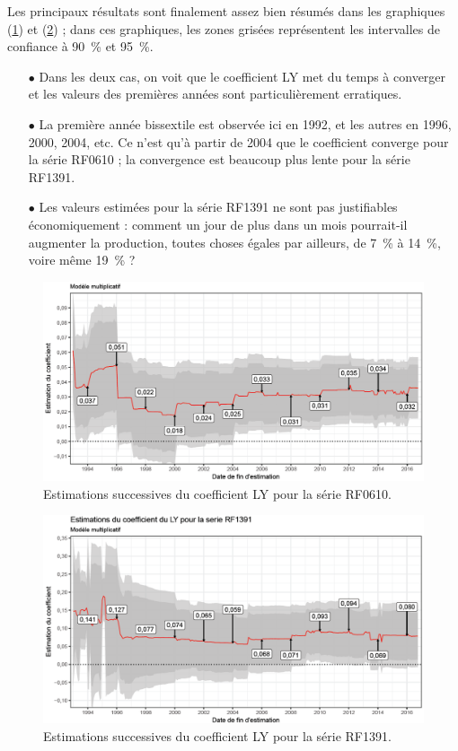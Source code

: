 \documentclass[12pt, a4paper, french]{article}
\begin{document}
Les principaux résultats sont finalement assez bien résumés dans les graphiques (\ref{fig:LYexemple1}) et (\ref{fig:LYexemple2}) ; dans ces graphiques, les zones grisées représentent les intervalles de confiance à 90~\% et 95~\%.
\begin{itemize}
	\item[$\bullet$] Dans les deux cas, on voit que le coefficient LY met du temps à converger et les valeurs des premières années sont particulièrement erratiques.
	\item[$\bullet$] La première année bissextile est observée ici en 1992, et les autres en 1996, 2000, 2004, etc. Ce n'est qu'à partir de 2004 que le coefficient converge pour la série RF0610 ; la convergence est beaucoup plus lente pour la série RF1391.
	\item[$\bullet$] Les valeurs estimées pour la série RF1391 ne sont pas justifiables économiquement : comment un jour de plus dans un mois pourrait-il augmenter la production, toutes choses égales par ailleurs, de 7~\% à 14~\%, voire même 19~\% ?
\end{itemize}


\begin{figure}[!ht]
\begin{center}
 \includegraphics[scale=0.50]{img/LYexemple1.png}
 \caption{Estimations successives du coefficient LY pour la série RF0610.}
 \label{fig:LYexemple1}
\end{center}
\end{figure}

\begin{figure}[!ht]
\begin{center}
 \includegraphics[scale=0.50]{img/LYexemple2.png}
 \caption{Estimations successives du coefficient LY pour la série RF1391.}
 \label{fig:LYexemple2}
\end{center}
\end{figure}
\end{document}

